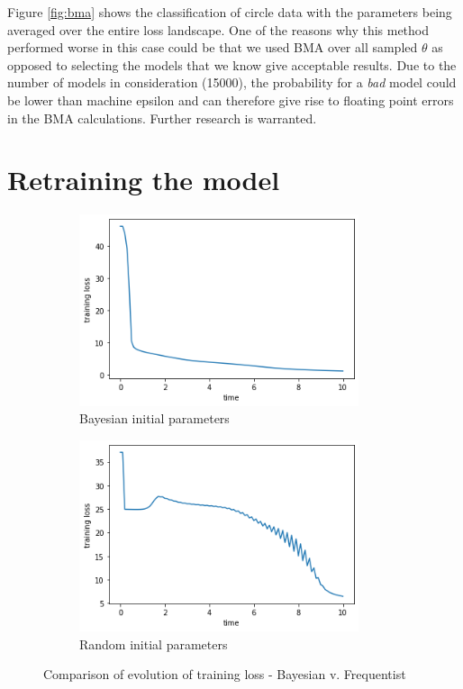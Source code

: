\documentclass[review]{siamart190516}
\begin{document}
Figure \ref{fig:bma} shows the classification of circle data with the parameters being averaged over the entire loss landscape. One of the reasons why this method performed worse in this case could be that we used BMA over all sampled $\theta$ as opposed to selecting the models that we know give acceptable results. Due to the number of models in consideration (15000), the probability for a \textit{bad} model could be lower than machine epsilon and can therefore give rise to floating point errors in the BMA calculations. Further research is warranted.
\section{Retraining the model}
\begin{figure}[!h]
		\begin{subfigure}[t]{0.5\textwidth}  
			\centering 
			\includegraphics[width=0.9\textwidth]{Images/training_loss_bayes.png}
			\caption{Bayesian initial parameters}\label{fig:loss_b}
		\end{subfigure}%
			\begin{subfigure}[t]{0.5\textwidth}  
			\centering 
			\includegraphics[width=0.9\textwidth]{Images/training_loss_gd.png}
			\caption{Random initial parameters}\label{loss_a}
		\end{subfigure}
		\label{trainingloss}
		\caption{Comparison of evolution of training loss - Bayesian v. Frequentist }
\end{figure}
\end{document}
